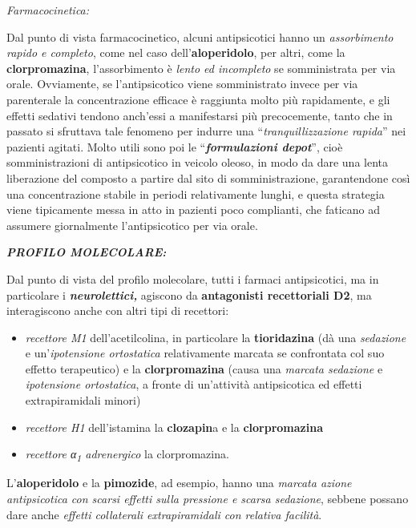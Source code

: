 \documentclass[]{article}
\begin{document}
\emph{\emph{Farmacocinetica:}}

Dal punto di vista farmacocinetico, alcuni antipsicotici hanno un
\emph{assorbimento rapido e completo}, come nel caso
dell'\textbf{aloperidolo}, per altri, come la \textbf{clorpromazina},
l'assorbimento è \emph{lento ed incompleto} se somministrata per via
orale. Ovviamente, se l'antipsicotico viene somministrato invece per via
parenterale la concentrazione efficace è raggiunta molto più
rapidamente, e gli effetti sedativi tendono anch'essi a manifestarsi più
precocemente, tanto che in passato si sfruttava tale fenomeno per
indurre una ``\emph{tranquillizzazione rapida}'' nei pazienti agitati.
Molto utili sono poi le ``\textbf{\emph{formulazioni depot}}'', cioè
somministrazioni di antipsicotico in veicolo oleoso, in modo da dare una
lenta liberazione del composto a partire dal sito di somministrazione,
garantendone così una concentrazione stabile in periodi relativamente
lunghi, e questa strategia viene tipicamente messa in atto in pazienti
poco complianti, che faticano ad assumere giornalmente l'antipsicotico
per via orale.

\textbf{\emph{PROFILO MOLECOLARE:}}

Dal punto di vista del profilo molecolare, tutti i farmaci
antipsicotici, ma in particolare i \textbf{\emph{neurolettici,}}
agiscono da \textbf{antagonisti recettoriali D2}, ma interagiscono anche
con altri tipi di recettori:

\begin{itemize}
\item
  \emph{recettore M1} dell'acetilcolina, in particolare la
  \textbf{tioridazina} (dà una \emph{sedazione} e un'\emph{ipotensione
  ortostatica} relativamente marcata se confrontata col suo effetto
  terapeutico) e la \textbf{clorpromazina} (causa una \emph{marcata
  sedazione} e \emph{ipotensione ortostatica}, a fronte di un'attività
  antipsicotica ed effetti extrapiramidali minori)
\item
  \emph{recettore H1} dell'istamina la \textbf{clozapin}a e la
  \textbf{clorpromazina }
\item
  \emph{recettore α\textsubscript{1} adrenergico} la clorpromazina.
\end{itemize}

L'\textbf{aloperidolo} e la \textbf{pimozide}, ad esempio, hanno una
\emph{marcata azione antipsicotica con scarsi effetti sulla pressione e
scarsa sedazione}, sebbene possano dare anche \emph{effetti collaterali
extrapiramidali con relativa facilità}.
\end{document}
